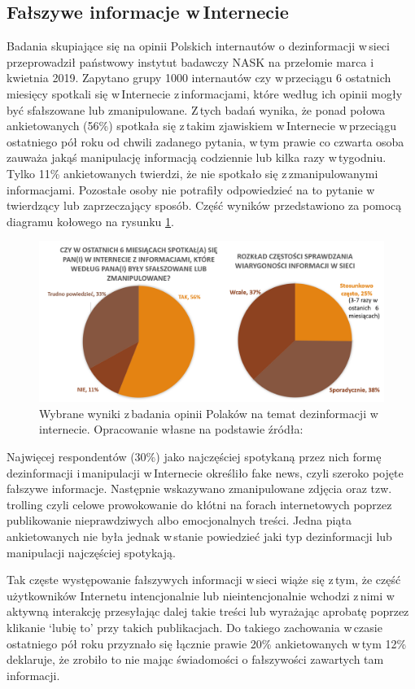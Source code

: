 \subsection{Fałszywe informacje w\,Internecie}
Badania skupiające się na opinii Polskich internautów o dezinformacji w\,sieci przeprowadził państwowy instytut badawczy NASK na przełomie marca i\,kwietnia 2019\cite{NASKBezpieczneWybory2019}. Zapytano grupy 1000 internautów czy w\,przeciągu 6 ostatnich miesięcy spotkali się w\,Internecie z\,informacjami, które według ich opinii mogły być sfałszowane lub zmanipulowane. Z\,tych badań wynika, że ponad połowa ankietowanych (56\%) spotkała się z\,takim zjawiskiem w\,Internecie w\,przeciągu ostatniego pół roku od chwili zadanego pytania, w\,tym prawie co czwarta osoba zauważa jakąś manipulację informacją codziennie lub kilka razy w\,tygodniu. Tylko 11\% ankietowanych twierdzi, że nie spotkało się z\,zmanipulowanymi informacjami. Pozostałe osoby nie potrafiły odpowiedzieć na to pytanie w\,twierdzący lub zaprzeczający sposób. Część wyników przedstawiono za pomocą diagramu kołowego na rysunku \ref{fig:NASKwyniki}.
\begin{figure}[!h]
	
	\centering \includegraphics[width=0.9\linewidth]{img/NASKwyniki.PNG}
	\caption{Wybrane wyniki z\,badania opinii Polaków na temat dezinformacji w\,internecie. Opracowanie własne na podstawie źródła: \cite{NASKBezpieczneWybory2019}}
	\label{fig:NASKwyniki}
\end{figure}
\par
\par
Najwięcej respondentów (30\%) jako najczęściej spotykaną przez nich formę dezinformacji i\,manipulacji w\,Internecie określiło fake news, czyli szeroko pojęte fałszywe informacje.  Następnie wskazywano zmanipulowane zdjęcia oraz tzw. trolling czyli celowe prowokowanie do kłótni na forach internetowych poprzez publikowanie nieprawdziwych albo emocjonalnych treści. Jedna piąta ankietowanych nie była jednak w\,stanie powiedzieć jaki typ dezinformacji lub manipulacji najczęściej spotykają.
\par
Tak częste występowanie fałszywych informacji w\,sieci wiąże się z\,tym, że część użytkowników Internetu intencjonalnie lub nieintencjonalnie wchodzi z\,nimi w\,aktywną interakcję przesyłając dalej takie treści lub wyrażając aprobatę poprzez klikanie ‘lubię to’ przy takich publikacjach. Do takiego zachowania w\,czasie ostatniego pół roku przyznało się łącznie prawie 20\% ankietowanych w\,tym 12\% deklaruje, że zrobiło to nie mając świadomości o fałszywości zawartych tam informacji\cite{NASKBezpieczneWybory2019}. 


